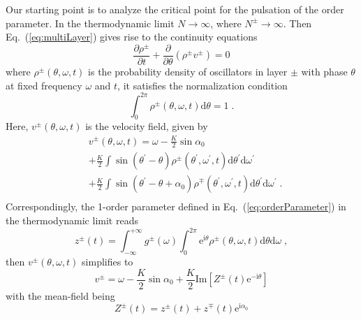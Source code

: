 \documentclass{article}
\begin{document}
Our starting point is to analyze the critical point for the pulsation of the order parameter.
In the thermodynamic limit $N\rightarrow \infty$, where $N^{\pm}\rightarrow \infty$. Then
Eq.~(\ref{eq:multiLayer}) gives rise to the continuity equations
\begin{equation}
    \label{eq:continuity}
    \frac{\partial \rho ^{\pm}}{\partial t}+\frac{\partial}{\partial \theta}\left( \rho ^{\pm}v^{\pm} \right) =0
\end{equation}
where $\rho ^{\pm}\left( \theta ,\omega ,t \right)$ is the probability density of oscillators in layer $\pm$ with phase $\theta$ at fixed frequency $\omega$ and $t$, it satisfies the normalization condition
\begin{equation}
    \label{eq:normalization}
    \int_{0}^{2\pi}{\rho ^{\pm}\left( \theta ,\omega ,t \right) \text{d}\theta} =1\;.
\end{equation}
Here, $v^{\pm}\left( \theta ,\omega ,t \right)$ is the velocity field, given by
\begin{equation}
    \begin{aligned}
        &v^{\pm}\left( \theta ,\omega ,t \right) =\omega -\frac{K}{2}\sin \alpha _0\\
        &+\frac{K}{2}\int{\sin \left( \theta ^{\prime}-\theta \right) \rho ^{\pm}\left( \theta ^{\prime},\omega ^{\prime},t \right) \text{d}\theta ^{\prime}\text{d}\omega ^{\prime}}\\
        &+\frac{K}{2}\int{\sin \left( \theta ^{\prime}-\theta +\alpha _0 \right) \rho ^{\mp}\left( \theta ^{\prime},\omega ^{\prime},t \right) \text{d}\theta ^{\prime}\text{d}\omega ^{\prime}}\;.\\
    \end{aligned}
\end{equation}
Correspondingly, the 1-order parameter defined in Eq.~(\ref{eq:orderParameter}) in the thermodynamic limit reads
\begin{equation}
    \label{eq:continuityZ}
    z^{\pm}\left( t \right) =\int_{-\infty}^{+\infty}{g^{\pm}(\omega)\int_0^{2\pi}{\text{e}^{\text{i}\theta}\rho ^{\pm}\left( \theta ,\omega ,t \right) \text{d}\theta \text{d}\omega}}\;,
\end{equation}
then $v^{\pm}\left( \theta ,\omega ,t \right)$ simplifies to
\begin{equation}
v^{\pm}=\omega -\frac{K}{2}\sin \alpha _0+\frac{K}{2}\mathrm{Im}\left[ Z^{\pm}\left( t \right) \mathrm{e}^{-\mathrm{i}\theta} \right] 
\end{equation}
with the mean-field being
\begin{equation}
    Z^{\pm}\left( t \right) =z^{\pm}\left( t \right) +z^{\mp}\left( t \right) \mathrm{e}^{\mathrm{i}\alpha _0}
\end{equation}
\end{document}
